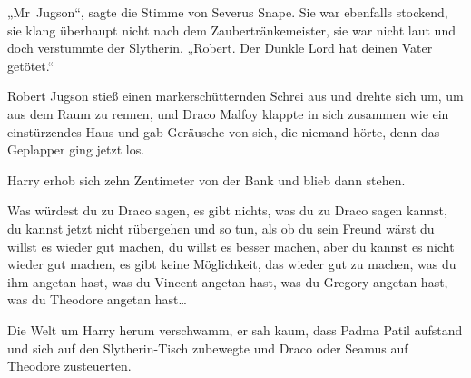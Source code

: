 „Mr~Jugson“, sagte die Stimme von Severus Snape.
Sie war ebenfalls stockend, sie klang überhaupt nicht nach dem Zaubertränkemeister, sie war nicht laut und doch verstummte der Slytherin.
„Robert. Der Dunkle Lord hat deinen Vater getötet.“

Robert Jugson stieß einen markerschütternden Schrei aus und drehte sich um, um aus dem Raum zu rennen, und Draco Malfoy klappte in sich zusammen wie ein einstürzendes Haus und gab Geräusche von sich, die niemand hörte, denn das Geplapper ging jetzt los.

Harry erhob sich zehn Zentimeter von der Bank und blieb dann stehen.

Was würdest du zu Draco sagen, es gibt nichts, was du zu Draco sagen kannst, du kannst jetzt nicht rübergehen und so tun, als ob du sein Freund wärst
du willst es wieder gut machen, du willst es besser machen, aber du kannst es nicht wieder gut machen, es gibt keine Möglichkeit, das wieder gut zu machen, was du ihm angetan hast, was du Vincent angetan hast, was du Gregory angetan hast, was du Theodore angetan hast…

Die Welt um Harry herum verschwamm, er sah kaum, dass Padma Patil aufstand und sich auf den Slytherin-Tisch zubewegte und Draco oder Seamus auf Theodore zusteuerten.

